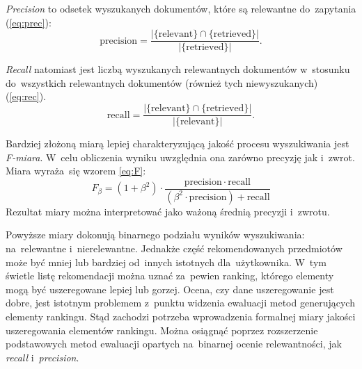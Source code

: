 \documentclass[pl]{minipw} %
\begin{document}
\textit{Precision} to odsetek wyszukanych dokumentów, które są relewantne do~zapytania (\ref{eq:prec}): 
\begin{equation}
\label{eq:prec}
\mathrm{precision}=\frac{|\{\mathrm{relevant}\} \cap \{\mathrm{retrieved}\}|}{|\{\mathrm{retrieved}\}|}.
\end{equation}

\textit{Recall} natomiast jest liczbą wyszukanych relewantnych dokumentów w~stosunku do~wszystkich relewantnych dokumentów (również tych niewyszukanych) (\ref{eq:rec}).
\begin{equation}
\label{eq:rec}
\mathrm{recall}=\frac{|\{\mathrm{relevant}\} \cap \{\mathrm{retrieved}\}|}{|\{\mathrm{relevant}\}|}.
\end{equation}

Bardziej złożoną miarą lepiej charakteryzującą jakość procesu wyszukiwania jest \textit{F-miara}. W~celu obliczenia wyniku uwzględnia ona zarówno precyzję jak i~zwrot. Miara wyraża~się wzorem \ref{eq:F}:
\begin{equation}
\label{eq:F}
F_\beta = (1 + \beta^2) \cdot \frac{\mathrm{precision} \cdot \mathrm{recall}}{(\beta^2 \cdot \mathrm{precision}) + \mathrm{recall}}
\end{equation}
Rezultat miary można interpretować jako ważoną średnią precyzji i~zwrotu. 

Powyższe miary dokonują binarnego podziału wyników wyszukiwania: na~relewantne i~nierelewantne. Jednakże część rekomendowanych przedmiotów może być mniej lub bardziej od~innych istotnych dla~użytkownika. W~tym świetle listę rekomendacji można uznać za~pewien ranking, którego elementy mogą być uszeregowane lepiej lub gorzej. Ocena, czy dane uszeregowanie jest dobre, jest istotnym problemem z~punktu widzenia ewaluacji metod generujących elementy rankingu. Stąd zachodzi potrzeba wprowadzenia formalnej miary jakości uszeregowania elementów rankingu. Można osiągnąć poprzez rozszerzenie podstawowych metod ewaluacji opartych na~binarnej ocenie relewantności, jak \textit{recall} i~\textit{precision}.
\end{document}
